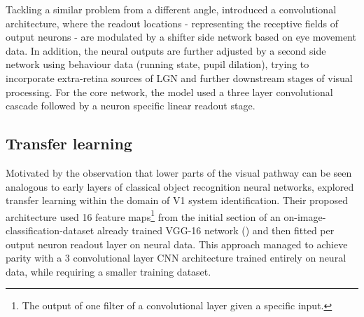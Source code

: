 Tackling a similar problem from a different angle, \cite{Walke506956} introduced a convolutional architecture, where the readout locations - representing the receptive fields of output neurons - are modulated by a shifter side network based on eye movement data. In addition, the neural outputs are further adjusted by a second side network using behaviour data (running state, pupil dilation), trying to incorporate extra-retina sources of LGN and further downstream stages of visual processing. For the core network, the model used a three layer convolutional cascade followed by a neuron specific linear readout stage. 

\subsection{Transfer learning}

Motivated by the observation that lower parts of the visual pathway can be seen analogous to early layers of classical object recognition neural networks, \cite{10.1371/journal.pcbi.1006897} explored transfer learning within the domain of V1 system identification. Their proposed architecture used 16 feature maps\footnote{The output of one filter of a convolutional layer given a specific input.} from the initial section of an on-image-classification-dataset already trained VGG-16 network (\cite{VGG16}) and then fitted per output neuron readout layer on neural data. This approach managed to achieve parity with a 3 convolutional layer CNN architecture trained entirely on neural data, while requiring a smaller training dataset.
